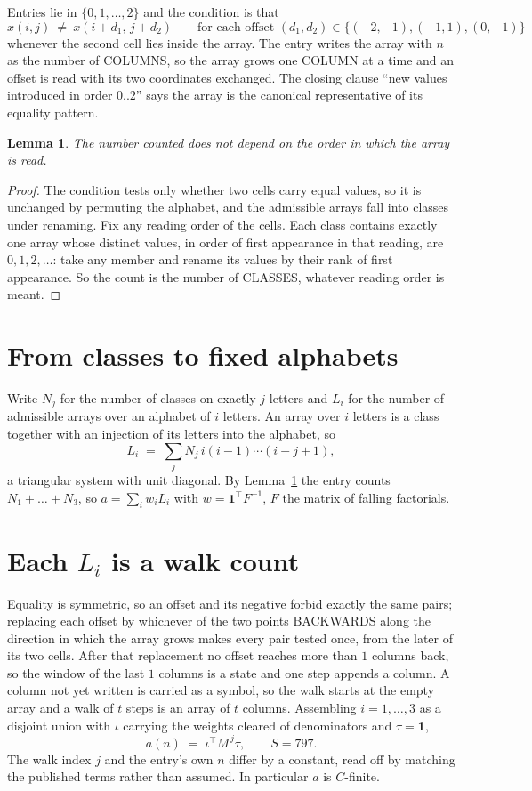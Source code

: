 \documentclass[11pt,a4paper]{article}
\theoremstyle{plain}
\newtheorem{lemma}[theorem]{Lemma}
\theoremstyle{definition}
\begin{document}
Entries lie in $\{0,1,\dots,2\}$ and the condition is that
\[
x(i,j)\ \ne\ x(i+d_1,\,j+d_2)\qquad\text{for each offset }(d_1,d_2)\in\{(-2,-1), (-1,1), (0,-1)\}
\]
whenever the second cell lies inside the array. The entry writes the array with $n$ as the number of COLUMNS, so the array grows one COLUMN at a time and an offset is read with its two coordinates exchanged. The closing clause ``new values
introduced in order $0..2$'' says the array is the canonical representative of its equality
pattern.

\begin{lemma}\label{lem:order}
The number counted does not depend on the order in which the array is read.
\end{lemma}

\begin{proof}
The condition tests only whether two cells carry equal values, so it is unchanged by permuting
the alphabet, and the admissible arrays fall into classes under renaming. Fix any reading order
of the cells. Each class contains exactly one array whose distinct values, in order of first
appearance in that reading, are $0,1,2,\dots$: take any member and rename its values by their
rank of first appearance. So the count is the number of CLASSES, whatever reading order is
meant.
\end{proof}

\section{From classes to fixed alphabets}

Write $N_j$ for the number of classes on exactly $j$ letters and $L_i$ for the number of
admissible arrays over an alphabet of $i$ letters. An array over $i$ letters is a class together
with an injection of its letters into the alphabet, so
\[
L_i\;=\;\sum_j N_j\,i(i-1)\cdots(i-j+1),
\]
a triangular system with unit diagonal. By Lemma~\ref{lem:order} the entry counts
$N_1+\dots+N_{3}$, so $a=\sum_i w_iL_i$ with $w=\mathbf{1}^{\!\top}F^{-1}$, $F$ the
matrix of falling factorials.

\section{Each $L_i$ is a walk count}

Equality is symmetric, so an offset and its negative forbid exactly the same pairs; replacing
each offset by whichever of the two points BACKWARDS along the direction in which the array
grows makes every pair tested once, from the later of its two cells. After that replacement no
offset reaches more than $1$ columns back, so the window of the last $1$
columns is a state and one step appends a column. A column not yet written is
carried as a symbol, so the walk starts at the empty array and a walk of $t$ steps is an array
of $t$ columns. Assembling $i=1,\dots,3$ as a disjoint union with $\iota$ carrying the
weights cleared of denominators and $\tau=\mathbf{1}$,
\[
a(n)\;=\;\iota^{\!\top}M^{\,j}\tau ,\qquad S=797.
\]
The walk index $j$ and the entry's own $n$ differ by a constant, read off by matching the
published terms rather than assumed. In particular $a$ is $C$-finite.
\end{document}
